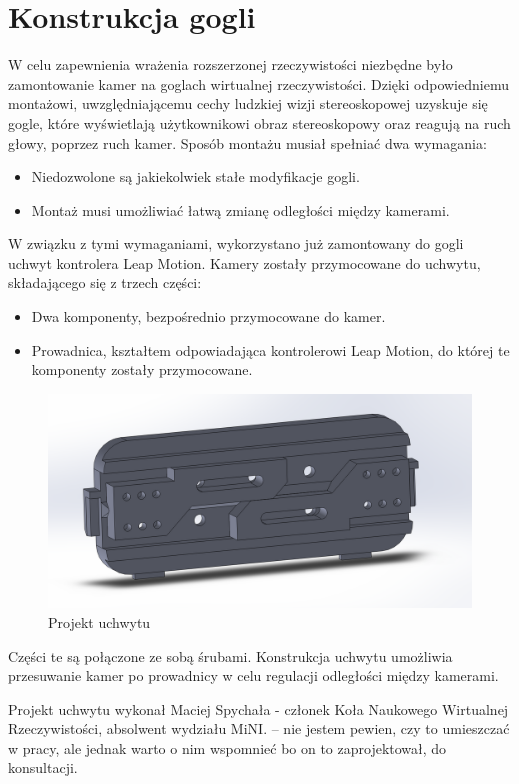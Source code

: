 \documentclass[a4paper,11pt,twoside]{report}
\theoremstyle{definition}
\begin{document}
\section{Konstrukcja gogli}
W celu zapewnienia wrażenia rozszerzonej rzeczywistości niezbędne było zamontowanie kamer na goglach wirtualnej rzeczywistości. Dzięki odpowiedniemu montażowi, uwzględniającemu cechy ludzkiej wizji stereoskopowej uzyskuje się gogle, które wyświetlają użytkownikowi obraz stereoskopowy oraz reagują na ruch głowy, poprzez ruch kamer.
Sposób montażu musiał spełniać dwa wymagania:
\begin{itemize}
\item Niedozwolone są jakiekolwiek stałe modyfikacje gogli.
\item Montaż musi umożliwiać łatwą zmianę odległości między kamerami.
\end{itemize}
W związku z tymi wymaganiami, wykorzystano już zamontowany do gogli uchwyt kontrolera Leap Motion. Kamery zostały przymocowane do uchwytu, składającego się z trzech części:
\begin{itemize}
\item Dwa komponenty, bezpośrednio przymocowane do kamer.
\item Prowadnica, kształtem odpowiadająca kontrolerowi Leap Motion, do której te komponenty zostały przymocowane.
\end{itemize}

\begin{figure}[H]
\centering
\includegraphics[scale=0.3]{images/cameraHolder}
\caption[Projekt uchwytu]{Projekt uchwytu}
\end{figure}

Części te są połączone ze sobą śrubami. Konstrukcja uchwytu umożliwia przesuwanie kamer po prowadnicy w celu regulacji odległości między kamerami.

Projekt uchwytu wykonał Maciej Spychała - członek Koła Naukowego Wirtualnej Rzeczywistości, absolwent wydziału MiNI. -- nie jestem pewien, czy to umieszczać w pracy, ale jednak warto o nim wspomnieć bo on to zaprojektował, do konsultacji.
\end{document}

